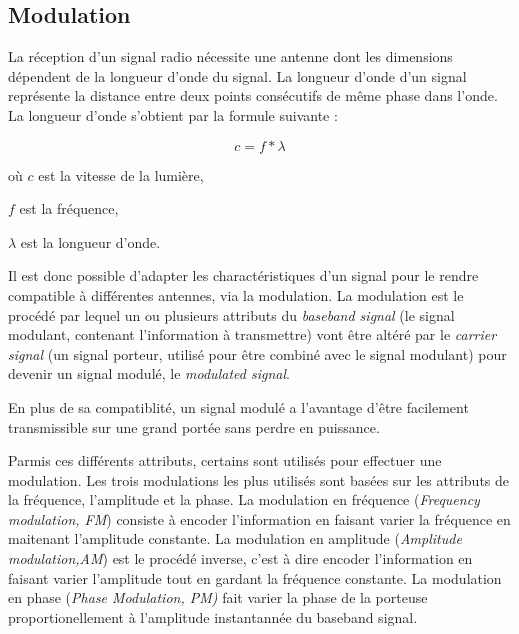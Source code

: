 \subsection{Modulation}\label{mod}

La réception d'un signal radio nécessite une antenne dont les dimensions dépendent de la longueur d'onde du signal. La longueur d'onde d'un signal représente la distance entre deux points consécutifs de même phase dans l'onde. La longueur d'onde s'obtient par la formule suivante :

\begin{equation}\label{eq1}
c = f * \lambda
\end{equation}

où $c$ est la vitesse de la lumière,

$f$ est la fréquence,

$\lambda$ est la longueur d'onde.

\vspace{0.1cm}

Il est donc possible d'adapter les charactéristiques d'un signal pour le rendre compatible à différentes antennes, via la modulation. La modulation est le procédé par lequel un ou plusieurs attributs du \textit{baseband signal} (le signal modulant, contenant l'information à transmettre) vont être altéré par le \textit{carrier signal} (un signal porteur, utilisé pour être combiné avec le signal modulant) pour devenir un signal modulé, le \textit{modulated signal}.

En plus de sa compatiblité, un signal modulé a l'avantage d'être facilement transmissible sur une grand portée sans perdre en puissance.

\vspace{0.1cm}

Parmis ces différents attributs, certains sont utilisés pour effectuer une modulation. Les trois modulations les plus utilisés sont basées sur les attributs de la fréquence, l'amplitude et la phase. La modulation en fréquence (\textit{Frequency modulation, FM}) consiste à encoder l'information en faisant varier la fréquence en maitenant l'amplitude constante. La modulation en amplitude (\textit{Amplitude modulation,AM}) est le procédé inverse, c'est à dire encoder l'information en faisant varier l'amplitude tout en gardant la fréquence constante. La modulation en phase (\textit{Phase Modulation, PM)} fait varier la phase de la porteuse proportionellement à l'amplitude instantannée du baseband signal.

\vspace{0.1cm}

